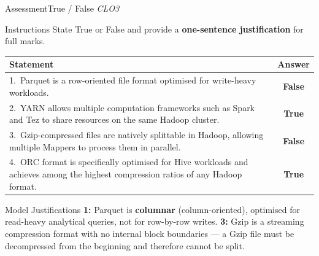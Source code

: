 \documentclass[aspectratio=169,10pt]{beamer}
\begin{document}
\begin{frame}{Assessment\textemdash True / False \hfill\small\textit{CLO3}}
  \begin{block}{Instructions}
    State True or False and provide a \textbf{one-sentence justification} for full marks.
  \end{block}
  \vspace{6pt}
  \centering
  \renewcommand{\arraystretch}{1.6}
  \begin{tabular}{p{9.0cm}c}
    \toprule
    \textbf{Statement} & \textbf{Answer} \\
    \midrule
    1.\ Parquet is a row-oriented file format optimised for write-heavy workloads. &
    \alert{\textbf{False}} \\
    2.\ YARN allows multiple computation frameworks such as Spark and Tez to share resources on the same Hadoop cluster. &
    \textbf{True} \\
    3.\ Gzip-compressed files are natively splittable in Hadoop, allowing multiple Mappers to process them in parallel. &
    \alert{\textbf{False}} \\
    4.\ ORC format is specifically optimised for Hive workloads and achieves among the highest compression ratios of any Hadoop format. &
    \textbf{True} \\
    \bottomrule
  \end{tabular}
  \vspace{6pt}
  \begin{exampleblock}{Model Justifications}
    \small \textbf{1:} Parquet is \textbf{columnar} (column-oriented), optimised for read-heavy analytical queries, not for row-by-row writes.  \textbf{3:} Gzip is a streaming compression format with no internal block boundaries — a Gzip file must be decompressed from the beginning and therefore cannot be split.
  \end{exampleblock}
\end{frame}
\end{document}
